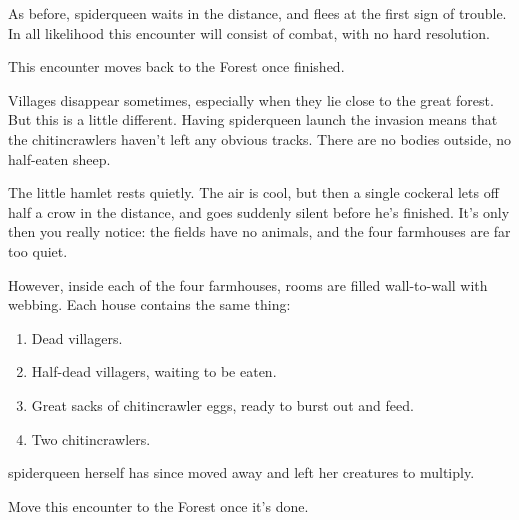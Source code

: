 \begin{multicols}{2}
As before, \gls{spiderqueen} waits in the distance, and flees at the first sign of trouble.  In all likelihood this encounter will consist of combat, with no hard resolution.

This encounter moves back to the Forest once finished.


Villages disappear sometimes, especially when they lie close to the great forest.  But this is a little different.  Having \gls{spiderqueen} launch the invasion means that the chitincrawlers haven't left any obvious tracks.  There are no bodies outside, no half-eaten sheep.

\begin{boxtext}
	The little hamlet rests quietly.  The air is cool, but then a single cockeral lets off half a crow in the distance, and goes suddenly silent before he's finished.  It's only then you really notice: the fields have no animals, and the four farmhouses are far too quiet.
\end{boxtext}

However, inside each of the four farmhouses, rooms are filled wall-to-wall with webbing.  Each house contains the same thing:

\begin{enumerate}

	\item{Dead villagers.}
	\item{Half-dead villagers, waiting to be eaten.}
	\item{Great sacks of chitincrawler eggs, ready to burst out and feed.}
	\item{Two chitincrawlers.}
\end{enumerate}

\Gls{spiderqueen} herself has since moved away and left her creatures to multiply.

Move this encounter to the Forest once it's done.

\begin{figure*}[t]

	\label{ruined_village_map}\label{ruined_village_map}

\end{figure*}


\chitincrawler



\end{multicols}
